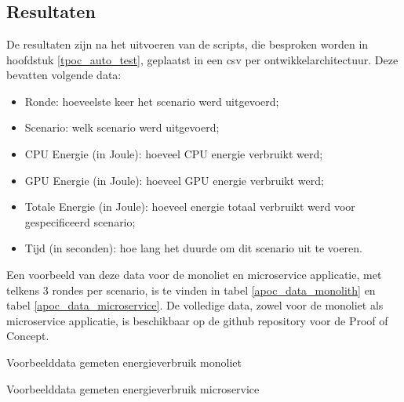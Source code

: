 

\chapter{}
\label{ch:analyse-test-poc}

\section{Resultaten}
De resultaten zijn na het uitvoeren van de scripts, die besproken worden in hoofdstuk \ref{tpoc_auto_test}, geplaatst in een csv per ontwikkelarchitectuur. Deze bevatten volgende data: 
\begin{itemize}
    \item Ronde: hoeveelste keer het scenario werd uitgevoerd;
    \item Scenario: welk scenario werd uitgevoerd;
    \item CPU Energie (in Joule): hoeveel CPU energie verbruikt werd;
    \item GPU Energie (in Joule): hoeveel GPU energie verbruikt werd;
    \item Totale Energie (in Joule): hoeveel energie totaal verbruikt werd voor gespecificeerd scenario;
    \item Tijd (in seconden): hoe lang het duurde om dit scenario uit te voeren.
\end{itemize}
Een voorbeeld van deze data voor de monoliet en microservice applicatie, met telkens 3 rondes per scenario, is te vinden in tabel \ref{apoc_data_monolith} en tabel \ref{apoc_data_microservice}. De volledige data, zowel voor de monoliet als microservice applicatie, is beschikbaar op de github repository voor de Proof of Concept.

\begin{table}[h!]
\caption{Voorbeelddata gemeten energieverbruik monoliet}
\label{apoc_data_monolith}
\end{table}

\begin{table}[h!]
    \caption{Voorbeelddata gemeten energieverbruik microservice}
    \label{apoc_data_microservice}
\end{table}
\pagebreak
